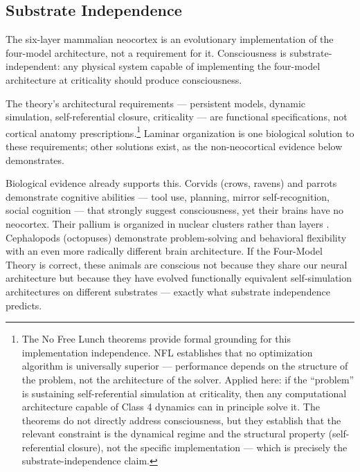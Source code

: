 \documentclass[12pt]{article}
\begin{document}
\subsection{Substrate Independence}


The six-layer mammalian neocortex is an evolutionary implementation of the four-model architecture, not a requirement for it. Consciousness is substrate-independent: any physical system capable of implementing the four-model architecture at criticality should produce consciousness.

The theory's architectural requirements --- persistent models, dynamic simulation, self-referential closure, criticality --- are functional specifications, not cortical anatomy prescriptions.\footnote{The No Free Lunch theorems \citep{WolpertMacready1997} provide formal grounding for this implementation independence. NFL establishes that no optimization algorithm is universally superior --- performance depends on the structure of the problem, not the architecture of the solver. Applied here: if the ``problem'' is sustaining self-referential simulation at criticality, then any computational architecture capable of Class 4 dynamics can in principle solve it. The theorems do not directly address consciousness, but they establish that the relevant constraint is the dynamical regime and the structural property (self-referential closure), not the specific implementation --- which is precisely the substrate-independence claim.} Laminar organization is one biological solution to these requirements; other solutions exist, as the non-neocortical evidence below demonstrates.

Biological evidence already supports this. Corvids (crows, ravens) and parrots demonstrate cognitive abilities --- tool use, planning, mirror self-recognition, social cognition --- that strongly suggest consciousness, yet their brains have no neocortex. Their pallium is organized in nuclear clusters rather than layers \citep{Gunturkun2016}. Cephalopods (octopuses) demonstrate problem-solving and behavioral flexibility with an even more radically different brain architecture. If the Four-Model Theory is correct, these animals are conscious not because they share our neural architecture but because they have evolved functionally equivalent self-simulation architectures on different substrates --- exactly what substrate independence predicts.
\end{document}

